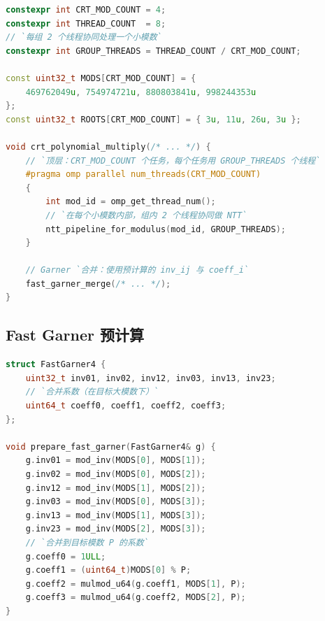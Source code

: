 \documentclass[UTF8,a4paper,10pt]{ctexart}
\begin{document}
\begin{lstlisting}[title=4 模数 grouped CRT 主体,frame=trbl,language={C++}]
constexpr int CRT_MOD_COUNT = 4;
constexpr int THREAD_COUNT  = 8;
// `每组 2 个线程协同处理一个小模数`
constexpr int GROUP_THREADS = THREAD_COUNT / CRT_MOD_COUNT;

const uint32_t MODS[CRT_MOD_COUNT] = {
    469762049u, 754974721u, 880803841u, 998244353u
};
const uint32_t ROOTS[CRT_MOD_COUNT] = { 3u, 11u, 26u, 3u };

void crt_polynomial_multiply(/* ... */) {
    // `顶层：CRT_MOD_COUNT 个任务，每个任务用 GROUP_THREADS 个线程`
    #pragma omp parallel num_threads(CRT_MOD_COUNT)
    {
        int mod_id = omp_get_thread_num();
        // `在每个小模数内部，组内 2 个线程协同做 NTT`
        ntt_pipeline_for_modulus(mod_id, GROUP_THREADS);
    }

    // Garner `合并：使用预计算的 inv_ij 与 coeff_i`
    fast_garner_merge(/* ... */);
}
\end{lstlisting}

\subsection{Fast Garner 预计算}

\begin{lstlisting}[title=Fast Garner 预计算,frame=trbl,language={C++}]
struct FastGarner4 {
    uint32_t inv01, inv02, inv12, inv03, inv13, inv23;
    // `合并系数（在目标大模数下）`
    uint64_t coeff0, coeff1, coeff2, coeff3;
};

void prepare_fast_garner(FastGarner4& g) {
    g.inv01 = mod_inv(MODS[0], MODS[1]);
    g.inv02 = mod_inv(MODS[0], MODS[2]);
    g.inv12 = mod_inv(MODS[1], MODS[2]);
    g.inv03 = mod_inv(MODS[0], MODS[3]);
    g.inv13 = mod_inv(MODS[1], MODS[3]);
    g.inv23 = mod_inv(MODS[2], MODS[3]);
    // `合并到目标模数 P 的系数`
    g.coeff0 = 1ULL;
    g.coeff1 = (uint64_t)MODS[0] % P;
    g.coeff2 = mulmod_u64(g.coeff1, MODS[1], P);
    g.coeff3 = mulmod_u64(g.coeff2, MODS[2], P);
}
\end{lstlisting}
\end{document}
